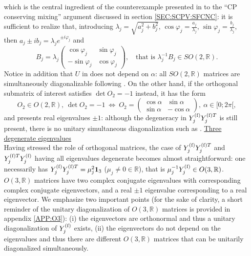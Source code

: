 \documentclass[12pt,a4paper]{article}
\begin{document}
which is the central ingredient of the counterexample presented in \cite{Ecker:1987md} to the ``CP conserving mixing'' argument discussed in section \ref{SEC:SCPV:SFCNC}: it is sufficient to realize that, introducing $\lambda_j=\sqrt{a_j^2+b_j^2}$, $\cos\varphi_j=\frac{a_j}{\lambda_j}$, $\sin\varphi_j=\frac{b_j}{\lambda_j}$, then $a_j\pm ib_j=\lambda_j e^{\pm i\varphi_j}$ and
\begin{equation}\label{eq:Bj}
B_j=\lambda_j\begin{pmatrix}\cos\varphi_j&\sin\varphi_j\\ -\sin\varphi_j & \cos\varphi_j\end{pmatrix},\quad \text{that is }\lambda_j^{-1}B_j\in SO(2,\mathbb{R}).
\end{equation}
 Notice in addition that $U$ in  does not depend on $\alpha$: all $SO(2,\mathbb{R})$ matrices are simultaneously diagonalizable following . On the other hand, if the orthogonal submatrix of interest satisfies $\det O_2=-1$ instead, it has the form
\begin{equation}
 O_2\in O(2,\mathbb{R}),\ \det O_2=-1\ \Leftrightarrow\ O_2=\begin{pmatrix}\cos \alpha & \sin\alpha\\ \sin\alpha&-\cos\alpha\end{pmatrix},\ \alpha\in [0;2\pi[,
\end{equation}
and presents real eigenvalues $\pm 1$: although the degeneracy in $Y_{j}^{\rm (f)}Y_{j}^{{\rm (f)}T}$ is still present, there is no unitary simultaneous diagonalization such as .
\newpage
\underline{Three degenerate eigenvalues}\\
Having stressed the role of orthogonal matrices, the case of $Y_{j}^{\rm (f)}Y_{j}^{{\rm (f)}T}$ and $Y_{j}^{{\rm (f)}T}Y_{j}^{\rm (f)}$ having all eigenvalues degenerate becomes almost straightforward: one necessarily has $Y_{j}^{\rm (f)}Y_{j}^{{\rm (f)}T}=\mu_j^2\mathbf{1}_3$ ($\mu_j\neq 0\in\mathbb{R}$), that is $\mu_j^{-1}Y_{j}^{\rm (f)}\in O(3,\mathbb{R})$. $O(3,\mathbb{R})$ matrices have two complex conjugate eigenvalues with corresponding complex conjugate eigenvectors, and a real $\pm 1$ eigenvalue corresponding to a real eigenvector. We emphasize two important points (for the sake of clarity, a short reminder of the unitary diagonalization of $O(3,\mathbb{R})$ matrices is provided in appendix \ref{APP:O3}): (i) the eigenvectors are orthonormal and thus a unitary diagonalization of $Y_{j}^{\rm (f)}$ exists, (ii) the eigenvectors do not depend on the eigenvalues and thus there are different $O(3,\mathbb{R})$ matrices that can be unitarily diagonalized simultaneously.
\end{document}

